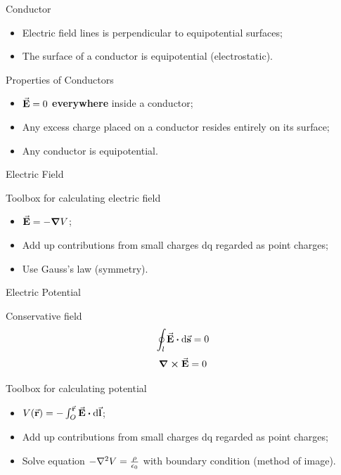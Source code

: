 \documentclass{beamer}
\begin{document}
\begin{frame}{Conductor}
    \begin{itemize}
        \item Electric field lines is perpendicular to equipotential surfaces;
        \item The surface of a conductor is equipotential (electrostatic).
    \end{itemize}
    \vspace{1em}
    \begin{beamerboxesrounded}[shadow=true]{Properties of Conductors}
        \begin{itemize}
            \item $\va{E} = 0$ \textbf{everywhere} inside a conductor;
            \item Any excess charge placed on a conductor resides entirely on its surface;
            \item Any conductor is equipotential.
        \end{itemize}
    \end{beamerboxesrounded}
\end{frame}


\begin{frame}{Electric Field}
    \begin{block}{Toolbox for calculating electric field}
        \begin{itemize}
            \item $\va{E} = -\grad{V}$;
            \item Add up contributions from small charges dq regarded as point charges;
            \item Use Gauss's law (symmetry).
        \end{itemize}
    \end{block}
\end{frame}

\begin{frame}{Electric Potential}
    \begin{block}{Conservative field}
        \begin{equation}
            \oint_l \va{E} \vdot \dd{\va{s}} = 0
        \end{equation}
        \begin{equation}
            \curl{\va{E}} = 0
        \end{equation}
    \end{block}

    \begin{block}{Toolbox for calculating potential}
        \begin{itemize}
            \item $V(\va{r}) = -\int_O^{\va{r}} \va{E} \vdot \dd{\va{l}}$;
            \item Add up contributions from small charges dq regarded as point charges;
            \item Solve equation $- \laplacian{V} = \frac{\rho}{\epsilon_0}$ with boundary condition (method of image).
        \end{itemize}
    \end{block}
\end{frame}
\end{document}
